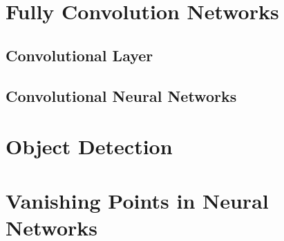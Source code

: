 \begin{spacing}{1.5}
\section{Fully Convolution Networks}
\label{sec:LR_FCN}

\subsection{Convolutional Layer}

\subsection{Convolutional Neural Networks}

\section{Object Detection}
\label{sec:LR_objectdetection}



\section{Vanishing Points in Neural Networks}
\label{sec:LR_vpinNN}



\end{spacing}
\newpage
